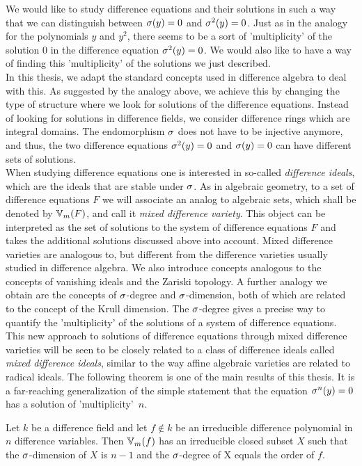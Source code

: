 We would like to study difference equations and their solutions in such a way that we can distinguish between $\sigma(y) = 0$ and $\sigma^2(y) = 0$. Just as in the analogy for the polynomials $y$ and $y^2$,
there seems to be a sort of 'multiplicity' of the solution $0$ in the difference equation $\sigma^2(y) = 0$. We would also like to have a way of finding this 'multiplicity' of the solutions we just described.
\\

In this thesis, we adapt the standard concepts used in difference algebra to deal with this. As suggested by the analogy above, we achieve this by changing the type of structure where we look for solutions of the difference equations. Instead of looking for solutions in difference fields, we consider difference rings which are integral domains. The endomorphism $\sigma$ does not have to be injective anymore, and thus, the two difference equations $\sigma^2(y) = 0$ and $\sigma(y) = 0$ can have different sets of solutions. \\

When studying difference equations one is interested in so-called \emph{difference ideals}, which are the ideals that are stable under $\sigma$. 
As in algebraic geometry, to a set of difference equations $F$ we will associate an analog to algebraic sets, which shall be denoted by $\mathbb{V}_m(F)$, 
and call it \emph{mixed difference variety}. 
This object can be interpreted as the set of solutions to the system of difference equations $F$  and takes the additional solutions discussed above into account.
Mixed difference varieties are analogous to, but different from the difference varieties usually studied in difference algebra.
We also introduce concepts analogous to the concepts of vanishing ideals and the Zariski topology.
A further analogy  we obtain are the concepts of $\sigma$-degree and $\sigma$-dimension, both of which are related to the concept of the Krull dimension.
The $\sigma$-degree gives a precise way to quantify the 'multiplicity' of the solutions of a system of difference equations.
This new approach to solutions of difference equations through mixed difference varieties will be seen to be closely related to a class of difference ideals called \emph{mixed difference ideals},
similar to the way affine algebraic varieties are related to radical ideals.
The following theorem is one of the main results of this thesis. It is a far-reaching generalization of the simple statement that the equation $\sigma^n(y) = 0$ has a solution of 'multiplicity'~$n$.

\begin{theorem*}[\ref{corfinal}]
Let $k$ be a difference field and let $f \notin k$ be an irreducible difference polynomial in $n$ difference variables. 
Then $\mathbb{V}_m(f)$ has an irreducible closed subset $X$ such that the $\sigma$-dimension of $X$ is $n-1$ and the $\sigma$-degree of X equals the order of $f$.
\end{theorem*}

